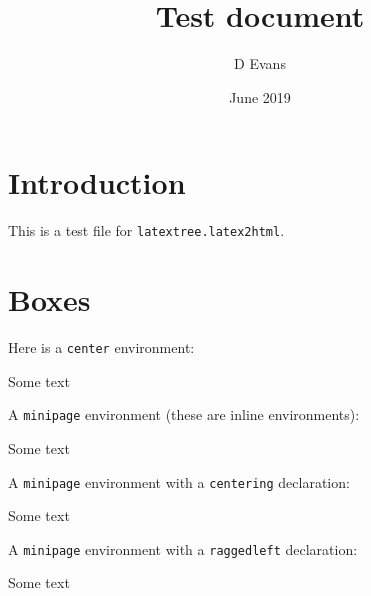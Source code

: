 \documentclass[12pt]{article}
\title{Test document}
\author{D Evans}
\date{June 2019}
\theoremstyle{plain}
\theoremstyle{definition}
\theoremstyle{remark}
\theoremstyle{mystyle}
\begin{document}
\maketitle
\tableofcontents

\begin{abstract}\noindent
\lipsum[2]
\end{abstract}

\section{Introduction}
\label{sec:intro}
This is a test file for \texttt{latextree.latex2html}.





\section{Boxes}

Here is a {\tt center} environment:
\begin{center}
Some text
\end{center}

A {\tt minipage} environment (these are inline environments):

\begin{minipage}{\linewidth}
Some text
\end{minipage}

A {\tt minipage} environment with a {\tt centering} declaration:

\begin{minipage}{\linewidth}
\centering
Some text
\end{minipage}

A {\tt minipage} environment with a {\tt raggedleft} declaration:

\begin{minipage}{\linewidth}
\raggedleft
Some text
\end{minipage}
\end{document}

